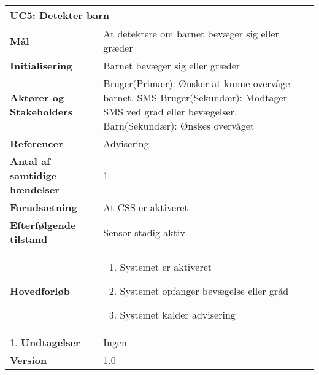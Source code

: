 \begin{table}[H] \centering
\begin{tabular}{|p{6cm}|p{8cm}|}
	\hline
\multicolumn{2}{|l|}{\textbf{UC5: Detekter barn}} \\\hline
\textbf{Mål}								&At detektere om barnet bevæger sig eller græder \\\hline
\textbf{Initialisering}					&Barnet bevæger sig eller græder\\\hline
\textbf{Aktører og Stakeholders}			&Bruger(Primær): Ønsker at kunne overvåge barnet. SMS Bruger(Sekundær): 																	Modtager SMS ved gråd eller bevægelser. Barn(Sekundær): Ønskes overvåget 				 \\\hline
\textbf{Referencer}						&Advisering \\\hline
\textbf{Antal af samtidige hændelser}	&1 \\\hline
\textbf{Forudsætning}					&At CSS er aktiveret \\\hline
\textbf{Efterfølgende tilstand}			&Sensor stadig aktiv \\\hline
\textbf{Hovedforløb}						&\begin{enumerate}
	
				\item Systemet er aktiveret
												
				\item Systemet opfanger bevægelse eller gråd
												
				\item Systemet kalder advisering
								
			\end{enumerate}\\\hline1.
\textbf{Undtagelser}					&Ingen \\\hline
		\textbf{Version}		&1.0 \\\hline
	\end{tabular}
	\label{UC5} 
\end{table}